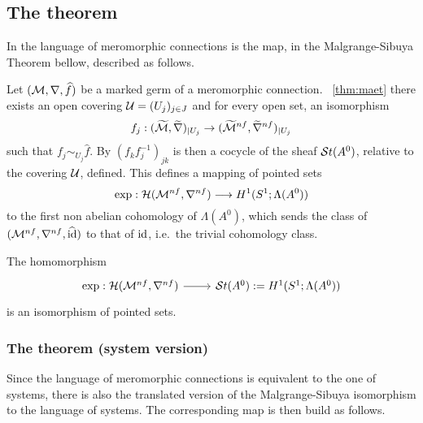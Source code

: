 \subsection{The theorem}
In the language of meromorphic connections is the map, in the Malgrange-Sibuya
Theorem bellow, described as follows.

Let $(\mathcal{M},\nabla,\widehat f)$ be a marked germ of a  meromorphic connection.
~\ref{thm:maet} there exists an open covering
$\mathcal{U}=(U_j)_{j\in J}$ and for every open set, an isomorphism
\[
  f_j:(\widetilde{\mathcal{M}},\widetilde\nabla)_{|U_j}
  \to(\widetilde{\mathcal{M}}^{nf},\widetilde\nabla^{nf})_{|U_j}
\]
such that $f_j\sim_{U_j}\hat f$.
By $(f_kf_j^{-1})_{jk}$ is then a cocycle of the sheaf $\mathcal{S}{}t(A^0)$, relative
to the covering $\mathcal{U}$, defined.
This defines a mapping of pointed sets
\[
  \exp:\mathcal{H}(\mathcal{M}^{nf},\nabla^{nf})\longrightarrow H^1(S^1;\Lambda(A^0))
\]
to the first non abelian cohomology of $\Lambda(A^0)$, which sends the class of
$(\mathcal{M}^{nf},\nabla^{nf},\widehat{\operatorname{id}})$ to that of $\operatorname{id}$, i.e.\ the trivial cohomology
class.

\begin{center}
  \begin{minipage}[t]{0.8\textwidth}
    \begin{tthm} \label{thm:mainThm1MeromVersion}
      The homomorphism
      \[ \begin{tikzcd}
          \exp:\cH(\cM^{nf},\nabla^{nf}) \rar& \St(A^0):=H^1(S^1;\Lambda(A^0))
      \end{tikzcd} \]
      is an isomorphism of pointed sets.
    \end{tthm}
  \end{minipage}
\end{center}

\subsubsection{The theorem (system version)}
Since the language of meromorphic connections is equivalent to the one of
systems, there is also the translated version of the Malgrange-Sibuya
isomorphism to the language of systems. The corresponding map is then build as
follows.

